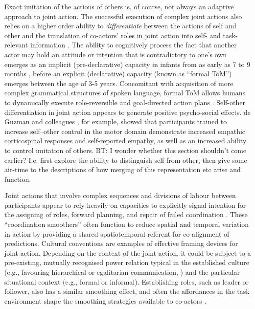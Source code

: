 \begin{CJK}{UTF8}{gbsn}
Exact imitation of the actions of others is, of course, not always an adaptive approach to joint action.  The successful execution of complex joint actions also relies on a higher order ability to \textit{differentiate} between the actions of self and other and the translation of co-actors' roles in joint action into self- and task-relevant information \citep{Novembre2012,Sowden2014,Milward2016}.
The ability to cognitively process the fact that another actor may hold an attitude or intention that is contradictory to one's own emerges as an implicit (pre-declarative) capacity in infants from as early as 7 to 9 months \citep{Baron-Cohen1991}, before an explicit (declarative) capacity (known as ``formal ToM'') emerges between the age of 3-5 years. Concomitant with acquisition of more complex grammatical structures of spoken language, formal ToM allows humans to dynamically execute role-reversible and goal-directed action plans \citep{Tomasello2005a,Tomasello2008,Tomasello2014}.  Self-other differentiation in joint action appears to generate positive psycho-social effects.  de Guzman and colleagues \textcite{DeGuzman2015}, for example, showed that participants trained to increase self–other control in the motor domain demonstrate increased empathic corticospinal responses and self-reported empathy, as well as an increased ability to control imitation of others.
BT: I wonder whether this section shouldn’t come earlier? I.e. first explore the ability to distinguish self from other, then give some air-time to the descriptions of how merging of this representation etc arise and function.

Joint actions that involve complex sequences and divisions of labour between participants appear to rely heavily on capacities to explicitly signal intention for the assigning of roles, forward planning, and repair of failed coordination \citep{Frith2010}. These ``coordination smoothers'' \citep{Vesper2017} often function to reduce spatial and temporal variation in action by providing a shared spatiotemporal referent for co-alignment of predictions.  Cultural conventions are examples of effective framing devices for joint action.  Depending on the context of the joint action, it could be subject to a pre-existing, mutually recognised power relation typical in the established culture (e.g., favouring hierarchical or egalitarian communication, \citep[see]{Cheon2011}) and the particular situational context (e.g., formal or informal).
Establishing roles, such as leader or follower, also has a similar smoothing effect, and often the affordances in the task environment shape the smoothing strategies available to co-actors \citep{Marsh2009}.


\end{CJK}
